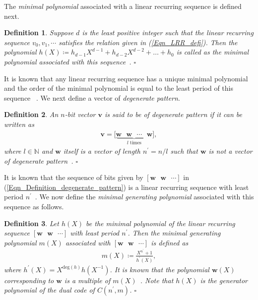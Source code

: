 \documentclass[10pt,journal]{IEEEtran}
\newtheorem{definition}{Definition}
\def \deg{{\mathrm{deg}}}
\begin{document}
The \textit{minimal polynomial} associated with a linear recurring sequence is defined next.
% 
\begin{definition}
\label{Definition_min_poly_LRR}
%  
Suppose $d$ is the least positive integer such that the linear recurring sequence $v_0, v_1, \cdots $ 
satisfies the relation given in (\ref{Eqn_LRR_defi}).
Then the polynomial $h(X) \coloneqq h_{d-1} X^{d-1} + h_{d-2} X^{d-2} + \ldots + h_{0}$ is called as
the minimal polynomial associated with this sequence~\cite[Sec.~6.4]{Lidl86}. 
% 
\hfill $\square$
% 
\end{definition}
% 
It is known that any linear recurring sequence has a unique minimal polynomial
and the order of the minimal polynomial is equal to the least period of this sequence ~\cite[Sec.~6.4]{Lidl86}.
We next define a vector of \textit{degenerate pattern}.
% 
\begin{definition}
\label{Definition_degenerate_pattern}
% 
An $n$-bit vector $\mathbf{v}$ is said to be of \textit{degenerate pattern} if it can be written as 
% 
\begin{align}
% 
\mathbf{v} = \Big[\underbrace{\mathbf{w} \mbox{~~} \mathbf{w} \mbox{~~} \cdots \mbox{~~} \mathbf{w}}_{l \text{ times}}\Big],
\label{Eqn_Definition_degenerate_pattern}
% 
\end{align}
% 
where $l \in \mathbb{N}$ and $\mathbf{w}$ itself is a vector of length $n^{\prime} = n/l$ such that
$\mathbf{w}$ is not a vector of degenerate pattern~\cite{Cancellieri_2015}.
% 
\hfill $\square$
% 
\end{definition}
% 

It is known that the sequence of bits given by $[\mathbf{w} \mbox{~~} \mathbf{w} \mbox{~~} \cdots]$ in (\ref{Eqn_Definition_degenerate_pattern})
is a linear recurring sequence with least period $n^{\prime}$~\cite{Lidl86}.
% 
We now define the \textit{minimal generating polynomial} associated with this sequence as follows.

% 
\begin{definition}
\label{Definition_min_gen_poly_LRR}
% 
Let $h(X)$ be the minimal polynomial of the linear recurring sequence
$[\mathbf{w} \mbox{~~} \mathbf{w} \mbox{~~} \cdots]$ with least period $n^{\prime}$.
Then the \textit{minimal generating polynomial} $m(X)$ associated with
$[\mathbf{w} \mbox{~~} \mathbf{w} \mbox{~~} \cdots]$ is defined as 
% 
\begin{align}
%  
m(X) \coloneqq \frac{X^{n^{\prime}} + 1}{h^{\prime}(X)},
% 
\end{align}
% 
where $h^{\prime}(X) = X^{\deg(h)} h(X^{-1})$.
It is known that the polynomial $\mathbf{w}(X)$ corresponding to $\mathbf{w}$ is a multiple of $m(X)$~\cite[Sec.~7.4]{Peterson_1996}.
Note that $h(X)$ is the generator polynomial of the dual code of $C(n^{\prime},m)$.
% 
\hfill $\square$
% 
\end{definition}
% 
\end{document}
